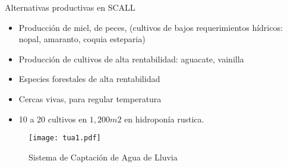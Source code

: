 Alternativas productivas en SCALL
\begin{itemize}
    \item Producción de miel, de peces, (cultivos de bajos requerimientos hídricos: nopal, amaranto, coquia esteparia)
    \item Producción de cultivos de alta rentabilidad: aguacate, vainilla
    \item Especies forestales de alta rentabilidad
    \item Cercas vivas, para regular temperatura
    \item 10 a 20 cultivos en $1,200m2$ en hidroponía rustica.
\end{itemize}
\begin{figure}[h!]
    \centering
      \texttt{[image: tua1.pdf]}
      \caption{Sistema de Captación de Agua de Lluvia}
      \label{tua1}
    \end{figure}
